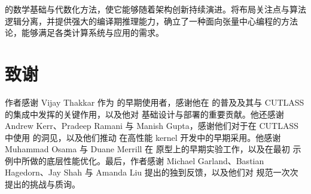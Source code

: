 \CuTe 的数学基础与代数化方法，使它能够随着架构创新持续演进。将布局关注点与算法逻辑分离，并提供强大的编译期推理能力，\CuTe 确立了一种面向张量中心编程的方法论，能够满足各类计算系统与应用的需求。

\section*{致谢}

作者感谢 Vijay Thakkar 作为 \CuTe 的早期使用者，感谢他在 \CuTe 的普及及其与 CUTLASS 的集成中发挥的关键作用，以及他对 \CuTe 基础设计与部署的重要贡献。他还感谢 Andrew Kerr、Pradeep Ramani 与 Manish Gupta，感谢他们对于在 CUTLASS 中使用 \CuTe 的洞见，以及他们推动 \CuTe 在高性能 kernel 开发中的早期采用。他感谢 Muhammad Osama 与 Duane Merrill 在 \CuTe 原型上的早期实验工作，以及在最初 \CuTe 示例中所做的底层性能优化。最后，作者感谢 Michael Garland、Bastian Hagedorn、Jay Shah 与 Amanda Liu 提出的独到反馈，以及他们对 \CuTe 规范一次次提出的挑战与质询。
